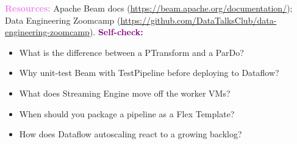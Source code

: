 \documentclass[11pt, a4paper]{article}
\newcommand{\resources}[1]{\vspace{1mm}\noindent\textbf{\textcolor{violet}{Resources:}} #1}
\newcommand{\selfcheck}[1]{\vspace{1mm}\noindent\textbf{\textcolor{purple}{Self-check:}} #1}
\begin{document}
\resources{Apache Beam docs (\url{https://beam.apache.org/documentation/}); Data Engineering Zoomcamp (\url{https://github.com/DataTalksClub/data-engineering-zoomcamp}).}
\selfcheck{\begin{itemize}[label=-, nosep, leftmargin=1.5em]
    \item What is the difference between a PTransform and a ParDo?
    \item Why unit-test Beam with TestPipeline before deploying to Dataflow?
    \item What does Streaming Engine move off the worker VMs?
    \item When should you package a pipeline as a Flex Template?
    \item How does Dataflow autoscaling react to a growing backlog?
\end{itemize}}
\end{document}
